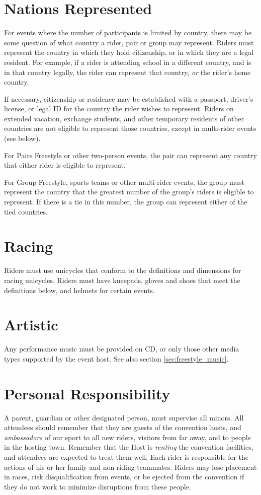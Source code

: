 \section{Nations Represented}
For events where the number of participants is limited by country, there may be some question of what country a rider, pair or group may represent.
Riders must represent the country in which they hold citizenship, or in which they are a legal resident.
For example, if a rider is attending school in a different country, and is in that country legally, the rider can represent that country, \textit{or} the rider's home country.

If necessary, citizenship or residence may be established with a passport, driver's license, or legal ID for the country the rider wishes to represent.
Riders on extended vacation, exchange students, and other temporary residents of other countries are not eligible to represent those countries, except in multi-rider events (see below).

For Pairs Freestyle or other two-person events, the pair can represent any country that either rider is eligible to represent.

For Group Freestyle, sports teams or other multi-rider events, the group must represent the country that the greatest number of the group's riders is eligible to represent.
If there is a tie in this number, the group can represent either of the tied countries.

\section{Racing}
Riders must use unicycles that conform to the definitions and dimensions for racing unicycles.
Riders must have kneepads, gloves and shoes that meet the definitions below, and helmets for certain events.

\section{Artistic}
Any performance music must be provided on CD, or only those other media types supported by the event host.
See also section \ref{sec:freestyle_music}.

\section{Personal Responsibility}
A parent, guardian or other designated person, must supervise all minors.
All attendees should remember that they are guests of the convention hosts, and \textit{ambassadors} of our sport to all new riders, visitors from far away, and to people in the hosting town.
Remember that the Host is \textit{renting} the convention facilities, and attendees are expected to treat them well.
Each rider is responsible for the actions of his or her family and non-riding teammates.
Riders may lose placement in races, risk disqualification from events, or be ejected from the convention if they do not work to minimize disruptions from these people.

